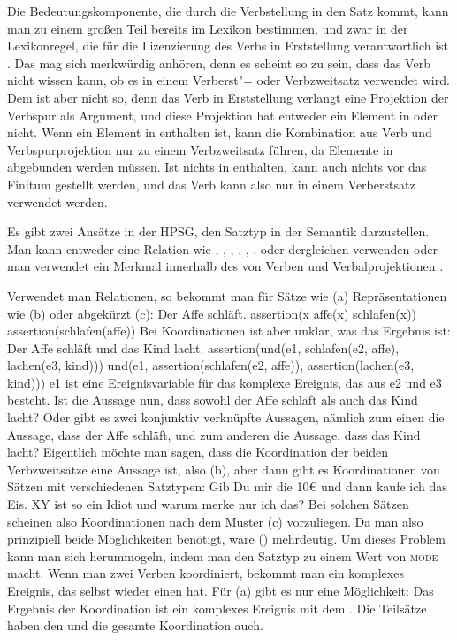 Die Bedeutungskomponente, die durch die Verbstellung in den Satz kommt, kann man zu einem
großen Teil bereits im Lexikon bestimmen, und zwar in der Lexikonregel, die für die Lizenzierung
des Verbs in Erststellung verantwortlich ist \citep[]{Kiss95b}. Das mag sich merkwürdig anhören, denn es scheint
so zu sein, dass das Verb nicht wissen kann, ob es in einem Verberst"= oder Verbzweitsatz verwendet
wird. Dem ist aber nicht so, denn das Verb in Erststellung verlangt eine Projektion der Verbspur
als Argument, und diese Projektion hat entweder ein Element in \slasch oder nicht. Wenn ein Element
in \slasch enthalten ist, kann die Kombination aus Verb und Verbspurprojektion nur zu einem Verbzweitsatz
führen, da Elemente in \slasch abgebunden werden müssen. Ist nichts in \slasch enthalten, kann auch nichts
vor das Finitum gestellt werden, und das Verb kann also nur in einem Verberstsatz verwendet werden.

Es gibt zwei Ansätze in der HPSG, den Satztyp in der Semantik darzustellen. Man kann entweder eine
Relation wie , , ,
, , ,  oder dergleichen verwenden
\parencites[378, 380]{GSag2000a-u}[59]{Kathol2001a}[Abschnitt~6.1.4]{mrs}{MuellerSatztypen} oder
man verwendet ein Merkmal innerhalb des \indexwes von Verben und Verbalprojektionen
\parencites[107]{SagW99a-u}[144, 170]{Kathol2000a}.


Verwendet man Relationen, so bekommt man für Sätze wie (a) Repräsentationen wie (b)
oder abgekürzt (c):
\eal
\ex Der Affe schläft.
\ex assertion(\iota x affe(x) \wedge{} schlafen(x))
\ex assertion(schlafen(affe))
\zl
Bei Koordinationen ist aber unklar, was das Ergebnis ist:
\eal
\ex Der Affe schläft und das Kind lacht.
\ex assertion(und(e1, schlafen(e2, affe), lachen(e3, kind)))
\ex und(e1, assertion(schlafen(e2, affe)), assertion(lachen(e3, kind)))
\zl
e1 ist eine Ereignisvariable für das komplexe Ereignis, das aus e2 und e3 besteht.
Ist die Aussage nun, dass sowohl der Affe schläft als auch das Kind lacht? Oder gibt es zwei konjunktiv
verknüpfte Aussagen, nämlich zum einen die Aussage, dass der Affe schläft, und zum anderen die
Aussage, dass das Kind lacht? Eigentlich möchte man sagen, dass die Koordination der beiden
Verbzweitsätze eine Aussage ist, also (b), aber dann gibt es Koordinationen von Sätzen mit
verschiedenen Satztypen:
\eal
\ex Gib Du mir die 10€ und dann kaufe ich das Eis.
\ex XY ist so ein Idiot und warum merke nur ich das?
\zl
Bei solchen Sätzen scheinen also Koordinationen nach dem Muster (c) vorzuliegen. Da man also
prinzipiell beide Möglichkeiten benötigt, wäre () mehrdeutig. Um dieses Problem kann man
sich herummogeln, indem man den Satztyp zu einem Wert von \textsc{mode} macht. Wenn man zwei Verben
koordiniert, bekommt man ein komplexes Ereignis, das selbst wieder einen \modew hat. Für (a)
gibt es nur eine Möglichkeit: Das Ergebnis der Koordination ist ein komplexes Ereignis mit dem
\modew {}. Die Teilsätze haben den \modew {} und die gesamte Koordination auch.

